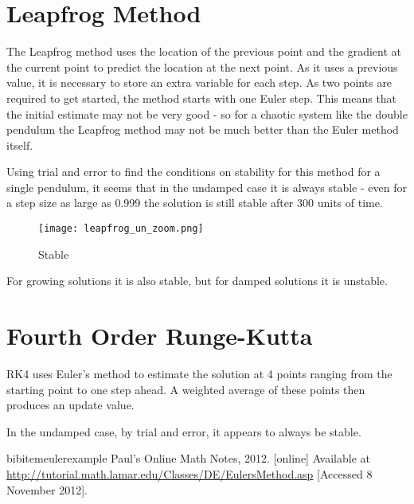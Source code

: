 \documentclass[a4paper,11pt,twoside]{article}
\begin{document}
\section{Leapfrog Method}
The Leapfrog method uses the location of the previous point and the
gradient at the current point to predict the location at the next 
point. As it uses a previous value, it is necessary to store an extra 
variable for each step. As two points are required to get started, the 
method starts with one Euler step. This means that the initial estimate 
may not be very good - so for a chaotic system like the double pendulum 
the Leapfrog method may not be much better than the Euler method itself.

Using trial and error to find the conditions on stability for this method 
for a single pendulum, it seems that in the undamped case it is always stable 
- even for a step size as large as 0.999 the solution is still stable 
after 300 units of time.

\begin{figure}[htb]
	\centering
	\texttt{[image: leapfrog\_un\_zoom.png]}
	\caption{Stable}
	\label{fig:leap_un}
\end{figure}

For growing solutions it is also stable, but for damped solutions it
is unstable.







\section{Fourth Order Runge-Kutta}
RK4 uses Euler's method to estimate the solution at 4 points ranging 
from the starting point to one step ahead. A weighted average 
of these points then produces an update value.

In the undamped case, by trial and error, it appears to always be stable.




\begin{thebibliography}{20}

bibitem{eulerexample}
Paul's Online Math Notes, 2012. [online] Available at \url{http://tutorial.math.lamar.edu/Classes/DE/EulersMethod.asp}
[Accessed 8 November 2012].

\end{thebibliography}
\end{document}
